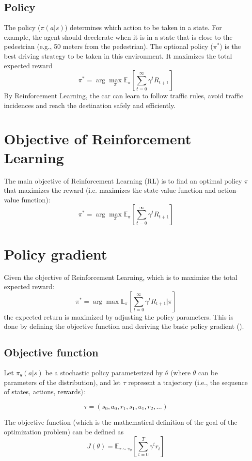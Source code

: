 \documentclass{article} %
\begin{document}
\subsection{Policy}
The policy (\({\pi}(a | s)\)) determines which action to be taken in a state. For example, the agent should decelerate when it is in a state that is close to the pedestrian (e.g., 50 meters from the pedestrian).
The optional policy (\(\pi^{*}\)) is the best driving strategy to be taken in this environment. It maximizes the total expected reward
\[
\pi^{*} = \arg \max_{\pi} \mathbb{E}_{\pi} \left[ \sum_{t=0}^{\infty} \gamma^t R_{t+1} \right]
\]
By Reinforcement Learning, the car can learn to follow traffic rules, avoid traffic incidences and reach the destination safely and efficiently. 

\section{Objective of Reinforcement Learning}
The main objective of Reinforcement Learning (RL) is to find an optimal policy $\pi$ that maximizes the reward (i.e. maximizes the state-value function and action-value function):
\[
\pi^{*} = \arg \max_{\pi} \mathbb{E}_{\pi} \left[ \sum_{t=0}^{\infty} \gamma^t R_{t+1} \right]
\]

\section{Policy gradient}
Given the objective of Reinforcement Learning, which is to maximize the total expected reward:
\[
\pi^{*} = \arg \max\mathbb{E}_{\pi} \left[ \sum_{t=0}^{\infty} \gamma^t R_{t+1} | {\pi} \right]
\]
the expected return is maximized by adjusting the policy parameters. This is done by defining the objective function and deriving the basic policy gradient (\cite{sutton1999policy}).

\subsection{Objective function}
Let \(\pi_\theta(a|s)\) be a stochastic policy parameterized by \(\theta\) (where \(\theta\) can be parameters of the distribution), and let \(\tau\) represent a trajectory (i.e., the sequence of states, actions, rewards):

\[
\tau = (s_0, a_0, r_1, s_1, a_1, r_2, \ldots)
\]

The objective function (which is the mathematical definition of the goal of the optimization problem) can be defined as
\[
J(\theta) = \mathbb{E}_{\tau \sim \pi_{\theta}} \left[ \sum_{t=0}^{T} \gamma^{t} r_{t} \right]
\]
\end{document}
